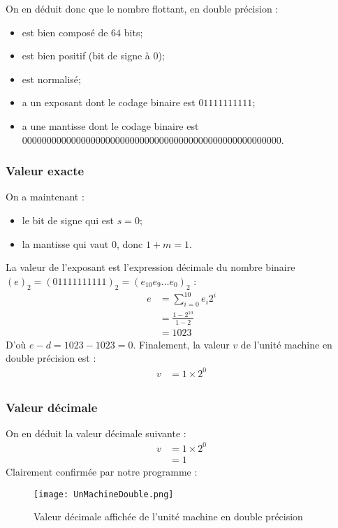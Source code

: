 \documentclass[a4paper, titlepage]{livret} %
\begin{document}
					On en déduit donc que le nombre flottant, en double précision :
					\begin{itemize}
						\item est bien composé de $64$ bits;
						\item est bien positif (bit de signe à 0);
						\item est normalisé;
						\item a un exposant dont le codage binaire est $01111111111$;
						\item a une mantisse dont le codage binaire est $00000000 00000000 00000000 00000000 00000000 00000000 00000$.
					\end{itemize}

				\subsubsection{Valeur exacte}
					On a maintenant : 
					\begin{itemize}
						\item le bit de signe qui est $s = 0$;
						\item la mantisse qui vaut $0$, donc $1+m = 1$.
					\end{itemize}
					La valeur de l'exposant est l'expression décimale du nombre binaire $(e)_{2} = (01111111111)_{2} = (e_{10}e_{9}…e_{0})_{2}$ :
					\[\begin{aligned}
						e & = \sum_{i=0}^{10} e_{i}2^{i}\\
						  & = \frac{1 - 2^{10}}{1 - 2}\\
						  & = 1023
					\end{aligned}\]
					D'où $e - d = 1023 - 1023 = 0$.
					Finalement, la valeur $v$ de l'unité machine en double précision est :
					\[\begin{aligned}
						v & = 1 \times 2^{0}\\
					\end{aligned}\]

				\subsubsection{Valeur décimale}
					On en déduit la valeur décimale suivante :
					\[\begin{aligned}
						v & = 1 \times 2^{0}\\
						  & = 1
					\end{aligned}\]
					Clairement confirmée par notre programme :
					\begin{figure}[!h]
						\centering
  							\texttt{[image: UnMachineDouble.png]}
  							\caption{Valeur décimale affichée de l'unité machine en double précision}
					\end{figure}
\end{document}
